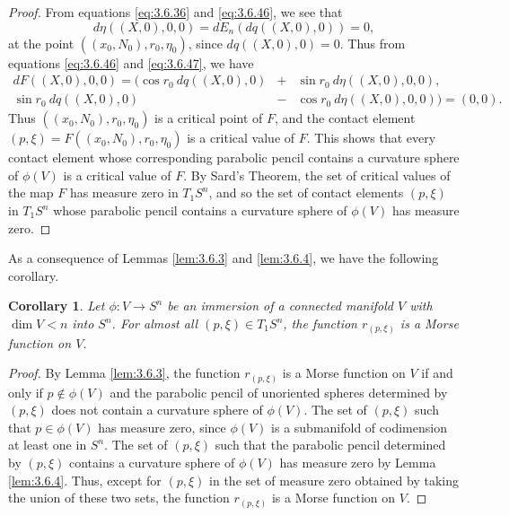 \documentclass[12pt]{article}
\newtheorem{corollary}{Corollary}[section]
\begin{document}
\begin{proof}
From equations
\eqref{eq:3.6.36} and \eqref{eq:3.6.46}, we see that 
\begin{equation}
\label{eq:3.6.47}
d\eta((X,0),0,0) = dE_n (dq((X,0),0)) = 0,
\end{equation}
at the point $((x_0,N_0),r_0,\eta_0)$, since $dq((X,0),0) = 0$.  
Thus from equations \eqref{eq:3.6.46} and \eqref{eq:3.6.47}, we have
\begin{eqnarray}
\label{eq:3.6.48}
dF((X,0),0,0) = ( \cos r_0\  dq((X,0),0) &+& \sin r_0\  d\eta((X,0),0,0), \\
\sin r_0\  dq((X,0),0) &-& \cos r_0\  d\eta((X,0),0,0)) = (0,0). \nonumber
\end{eqnarray} 
Thus $((x_0,N_0),r_0,\eta_0)$ is a critical point of $F$, and the contact element
$(p,\xi) = F((x_0,N_0),r_0,\eta_0)$ is a critical value of $F$.  This shows that every contact element whose
corresponding parabolic pencil contains a curvature sphere of $\phi (V)$ is a critical value
of $F$. By Sard's Theorem, 
the set of critical values of the map $F$  has measure zero in $T_1S^n$, and so the
set of contact elements $(p,\xi)$ in $T_1S^n$ whose parabolic pencil contains a curvature sphere of $\phi (V)$
has measure zero. 
\end{proof}

As a consequence of Lemmas \ref{lem:3.6.3} and \ref{lem:3.6.4}, we have the following corollary.

\begin{corollary}
\label{cor:3.6.5} 
Let $\phi:V \rightarrow S^n$ be an immersion of a connected manifold $V$ with $\dim V < n$ into
$S^n$.  For almost all
$(p,\xi) \in T_1S^n$, the function $r_{(p,\xi)}$ is a Morse function on $V$. 
\end{corollary}
\begin{proof}
By Lemma \ref{lem:3.6.3}, the function $r_{(p,\xi)}$ is a Morse function on $V$ if and only if 
$p \notin \phi (V)$ and the parabolic
pencil of unoriented spheres determined by $(p,\xi)$ does not contain a curvature sphere of $\phi(V)$.
The set of $(p,\xi)$ such that $p \in \phi (V)$ has measure zero, since $\phi(V)$ is a submanifold of codimension
at least one in $S^n$. The set of $(p,\xi)$ such that the parabolic pencil determined by $(p,\xi)$ contains
a curvature sphere of $\phi(V)$ has measure zero by Lemma \ref{lem:3.6.4}.  Thus, except for $(p,\xi)$ in the 
set of measure zero obtained by taking the union of these two sets, 
the function $r_{(p,\xi)}$ is a Morse function on $V$.
\end{proof}
\end{document}
